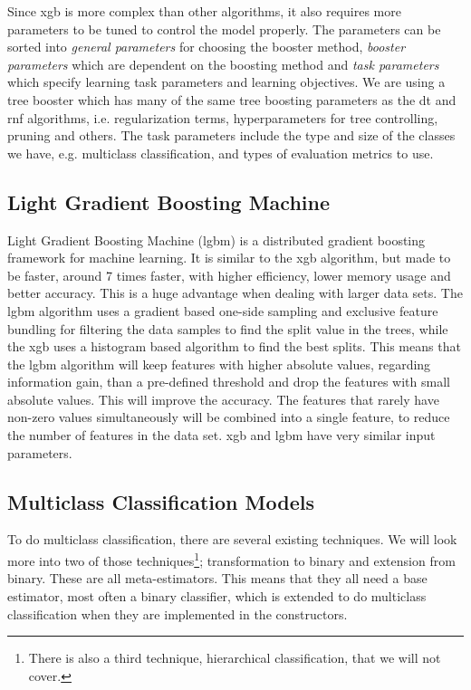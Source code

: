 \documentclass[a4paper, american, 12pt]{report}
\begin{document}
	Since \acrshort{xgb} is more complex than other algorithms, it also requires more parameters to be tuned to control the model properly. The parameters can be sorted into \textit{general parameters} for choosing the booster method, \textit{booster parameters} which are dependent on the boosting method and \textit{task parameters} which specify learning task parameters and learning objectives. We are using a tree booster which has many of the same tree boosting parameters as the \acrshort{dt} and \acrshort{rnf} algorithms, i.e. regularization terms, hyperparameters for tree controlling, pruning and others. The task parameters include the type and size of the classes we have, e.g. multiclass classification, and types of evaluation metrics to use.
	
	
	\subsection{Light Gradient Boosting Machine}
	\label{subsect:Theory-LGBM}
	Light Gradient Boosting Machine (\acrshort{lgbm})\cite{lightgbm} is a distributed gradient boosting framework for machine learning. It is similar to the \acrshort{xgb} algorithm, but made to be faster, around 7 times faster, with higher efficiency, lower memory usage and better accuracy. This is a huge advantage when dealing with larger data sets. The \acrshort{lgbm} algorithm uses a gradient based one-side sampling and exclusive feature bundling for filtering the data samples to find the split value in the trees, while the \acrshort{xgb} uses a histogram based algorithm to find the best splits. This means that the \acrshort{lgbm} algorithm will keep features with higher absolute values, regarding information gain, than a pre-defined threshold and drop the features with small absolute values. This will improve the accuracy. The features that rarely have non-zero values simultaneously will be combined into a single feature, to reduce the number of features in the data set. \acrshort{xgb} and \acrshort{lgbm} have very similar input parameters.
	
	
	\subsection{Multiclass Classification Models}
	\label{subsect:Theory-MultiClassModels}
	To do multiclass classification, there are several existing techniques. We will look more into two of those techniques\footnote{There is also a third technique, hierarchical classification, that we will not cover.}; transformation to binary and extension from binary. These are all meta-estimators. This means that they all need a base estimator, most often a binary classifier, which is extended to do multiclass classification when they are implemented in the constructors.
	
\end{document}
